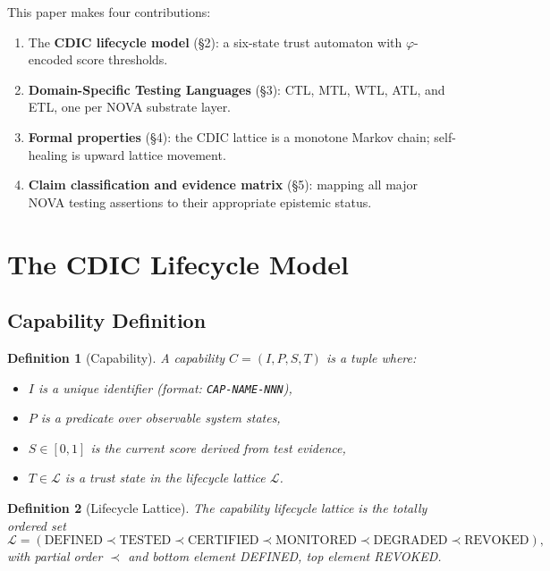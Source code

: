 \documentclass[11pt,a4paper]{article}
\newtheorem{definition}{Definition}
\begin{document}
This paper makes four contributions:
\begin{enumerate}
  \item The \textbf{CDIC lifecycle model} (§2): a six-state trust automaton with
    $\varphi$-encoded score thresholds.
  \item \textbf{Domain-Specific Testing Languages} (§3): CTL, MTL, WTL, ATL, and ETL,
    one per NOVA substrate layer.
  \item \textbf{Formal properties} (§4): the CDIC lattice is a monotone Markov chain;
    self-healing is upward lattice movement.
  \item \textbf{Claim classification and evidence matrix} (§5): mapping all major
    NOVA testing assertions to their appropriate epistemic status.
\end{enumerate}

\section{The CDIC Lifecycle Model}
\label{sec:lifecycle}

\subsection{Capability Definition}

\begin{definition}[Capability]
A \emph{capability} $C = (I, P, S, T)$ is a tuple where:
\begin{itemize}[noitemsep]
  \item $I$ is a unique identifier (format: \texttt{CAP-NAME-NNN}),
  \item $P$ is a predicate over observable system states,
  \item $S \in [0,1]$ is the current score derived from test evidence,
  \item $T \in \mathcal{L}$ is a trust state in the lifecycle lattice $\mathcal{L}$.
\end{itemize}
\end{definition}

\begin{definition}[Lifecycle Lattice]
The \emph{capability lifecycle lattice} is the totally ordered set
\[
  \mathcal{L} = (\text{DEFINED} \prec \text{TESTED} \prec
                 \text{CERTIFIED} \prec \text{MONITORED} \prec
                 \text{DEGRADED} \prec \text{REVOKED}),
\]
with partial order $\prec$ and bottom element DEFINED, top element REVOKED.
\end{definition}
\end{document}
